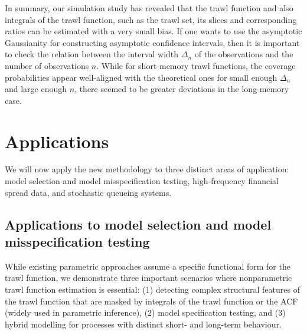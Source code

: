 \documentclass{article}
\theoremstyle{plain}
\theoremstyle{definition}
\theoremstyle{remark}
\begin{document}
In summary, our simulation study has revealed that the trawl function and also integrals of the trawl function, such as the trawl set, its slices and corresponding ratios can be estimated with a very small bias. If one wants to use the asymptotic Gaussianity for constructing asymptotic confidence intervals, then it is important to check the relation between the interval width $\Delta_n$ of the observations and the number of observations $n$. While for short-memory trawl functions, the coverage probabilities appear well-aligned with the theoretical ones for small enough $\Delta_n$ and large enough $n$, there seemed to be greater deviations in the long-memory case. 




\section{Applications}\label{sec:Emp}
We will now apply the new methodology to three distinct areas of application: model selection and model misspecification testing, high-frequency financial spread data, and stochastic queueing systems.

\subsection{Applications to model selection and model misspecification testing }
While existing parametric approaches assume a specific functional form for the trawl function, we demonstrate three important scenarios where nonparametric trawl function estimation is essential: (1) detecting complex structural features of the trawl function that are masked by integrals of the trawl function or the ACF (widely used in parametric inference), (2) model specification testing, and (3) hybrid modelling for processes with distinct short- and long-term behaviour.
\end{document}
